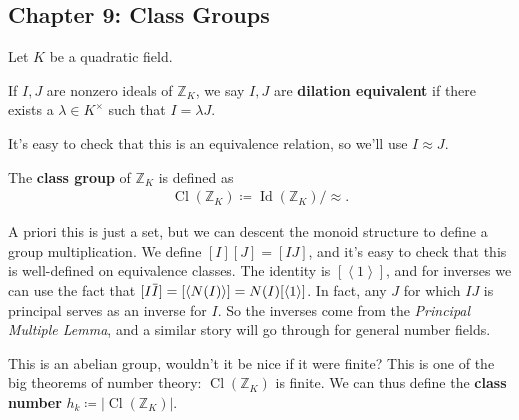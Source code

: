 \hypertarget{chapter-9-class-groups}{%
\subsection{Chapter 9: Class Groups}\label{chapter-9-class-groups}}

Let \(K\) be a quadratic field.

\begin{definition}[?]

If \(I, J\) are nonzero ideals of \({\mathbb{Z}}_K\), we say \(I, J\)
are \textbf{dilation equivalent} if there exists a
\(\lambda\in K^{\times}\) such that \(I = \lambda J\).

\end{definition}

\begin{remark}

It's easy to check that this is an equivalence relation, so we'll use
\(I \approx J\).

\end{remark}

\begin{definition}[?]

The \textbf{class group} of \({\mathbb{Z}}_K\) is defined as
\begin{align*}
\operatorname{Cl}({\mathbb{Z}}_K) \coloneqq\operatorname{Id}({\mathbb{Z}}_K)/\approx
.\end{align*}

\end{definition}

\begin{remark}

A priori this is just a set, but we can descent the monoid structure to
define a group multiplication. We define \([I] [J] = [IJ]\), and it's
easy to check that this is well-defined on equivalence classes. The
identity is \([ \left\langle{ 1 }\right\rangle]\), and for inverses we
can use the fact that
\([I \mkern 1.5mu\overline{\mkern-1.5muI\mkern-1.5mu}\mkern 1.5mu] = [\left\langle{ N(I) }\right\rangle] = N(I) [ \left\langle{ 1 }\right\rangle ]\).
In fact, any \(J\) for which \(IJ\) is principal serves as an inverse
for \(I\). So the inverses come from the \emph{Principal Multiple
Lemma}, and a similar story will go through for general number fields.

\end{remark}

\begin{remark}

This is an abelian group, wouldn't it be nice if it were finite? This is
one of the big theorems of number theory:
\(\operatorname{Cl}({\mathbb{Z}}_K)\) is finite. We can thus define the
\textbf{class number}
\(h_k \coloneqq{\left\lvert { \operatorname{Cl}({\mathbb{Z}}_K) } \right\rvert}\).

\end{remark}

